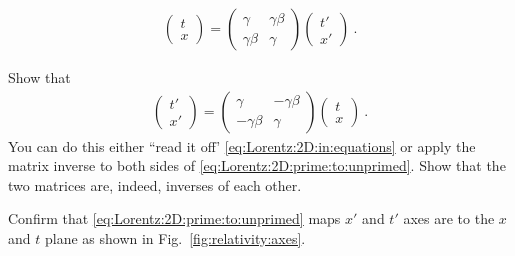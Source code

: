 \documentclass[12pt, oneside]{report}    %
\begin{document}
\begin{align}
    \begin{pmatrix}
        t\\
        x
    \end{pmatrix}
    =
    \begin{pmatrix}
        \gamma & \gamma \beta \\
        \gamma \beta & \gamma
    \end{pmatrix}
    \begin{pmatrix}
        t'\\
        x'
    \end{pmatrix} \ .
    \label{eq:Lorentz:2D:prime:to:unprimed}
\end{align}
\begin{exercise}
Show that 
\begin{align}
    \begin{pmatrix}
        t'\\
        x'
    \end{pmatrix}
    =
    \begin{pmatrix}
        \gamma & -\gamma \beta \\
        -\gamma \beta & \gamma
    \end{pmatrix}
    \begin{pmatrix}
        t\\
        x
    \end{pmatrix} \ .
\end{align}
You can do this either ``read it off' \eqref{eq:Lorentz:2D:in:equations} or apply the matrix inverse to both sides of \eqref{eq:Lorentz:2D:prime:to:unprimed}. Show that the two matrices are, indeed, inverses of each other.
\end{exercise}
\begin{exercise}
Confirm that \eqref{eq:Lorentz:2D:prime:to:unprimed} maps $x'$ and $t'$ axes are to the $x$ and $t$ plane as shown in Fig.~\ref{fig:relativity:axes}.
\end{exercise}

\end{document}
